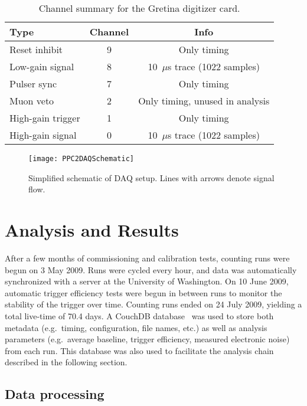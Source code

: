 			\begin{table}
				\centering
				\begin{tabular}{l|c|c}
					Type & Channel &  Info \\
					\hline
					\hline
					Reset inhibit & 9 & Only timing \\
					\hline
					Low-gain signal & 8 & 10~$\mu$s trace (1022	 samples) \\
					\hline
					Pulser sync & 7 & Only timing \\
					\hline				
					Muon veto & 2 & Only timing, unused in analysis \\
					\hline								
					High-gain trigger & 1 & Only timing \\
					\hline								
					High-gain signal & 0 & 10~$\mu$s trace (1022 samples) \\				
					\hline
					\hline
				\end{tabular}
				\caption{Channel summary for the Gretina digitizer card.  }
				\label{tab:PPC2DAQChannelInfo}
			\end{table}	     
	
	
			\begin{sidewaysfigure}
				\centering
				\texttt{[image: PPC2DAQSchematic]}
				\caption{Simplified schematic of DAQ setup.  Lines with arrows denote signal flow.}
				\label{fig:PPC2DAQSetup}
			\end{sidewaysfigure}
		     			
	\section{Analysis and Results}
	\label{sec:DeploymentPPC2SoudanAnalysis}
	
	After a few months of commissioning and calibration tests, counting runs were begun on 3 May 2009.  Runs were cycled every hour, and data was automatically synchronized with a server at the University of Washington.  On 10 June 2009, automatic trigger efficiency tests were begun in between runs to monitor the stability of the trigger over time.  Counting runs ended on 24 July 2009, yielding a total live-time of 70.4 days.  A CouchDB database~\cite{CouchDB} was used to store both metadata (e.g.~timing, configuration, file names, etc.) as well as analysis parameters (e.g.~average baseline, trigger efficiency, measured electronic noise) from each run.  This database was also used to facilitate the analysis chain described in the following section.    

		\subsection{Data processing}
		\label{sec:DeploymentPPC2DataProcessing}	
	
